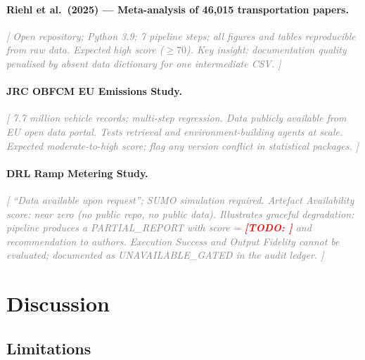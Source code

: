 \documentclass{article}
\newcommand{\outline}[1]{\textcolor{gray}{\textit{[#1]}}}
\newcommand{\todo}[1]{\textcolor{red}{\textbf{[TODO: #1]}}}
\begin{document}
\paragraph{Riehl et al.\ (2025) — Meta-analysis of 46,015 transportation papers.}
\outline{%
  Open repository; Python 3.9; 7 pipeline steps; all figures and tables
  reproducible from raw data.
  Expected high score ($\geq 70$).
  Key insight: documentation quality penalised by absent data dictionary
  for one intermediate CSV.
}

\paragraph{JRC OBFCM EU Emissions Study.}
\outline{%
  7.7 million vehicle records; multi-step regression.
  Data publicly available from EU open data portal.
  Tests retrieval and environment-building agents at scale.
  Expected moderate-to-high score; flag any version conflict in
  statistical packages.
}

\paragraph{DRL Ramp Metering Study.}
\outline{%
  ``Data available upon request''; SUMO simulation required.
  Artefact Availability score: near zero (no public repo, no public data).
  Illustrates graceful degradation: pipeline produces a PARTIAL\_REPORT
  with score = \todo{} and recommendation to authors.
  Execution Success and Output Fidelity cannot be evaluated; documented
  as UNAVAILABLE\_GATED in the audit ledger.
}

\section{Discussion}
\label{sec:discussion}

\subsection{Limitations}
\label{sec:limitations}
\end{document}

